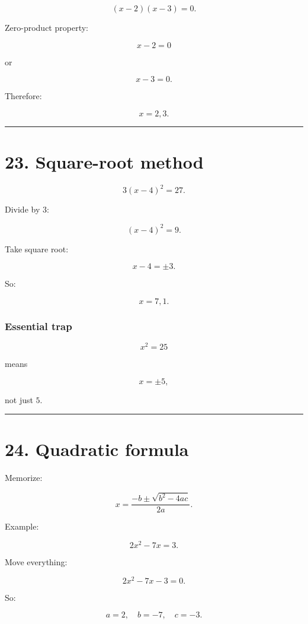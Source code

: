 \documentclass[
]{article}
\begin{document}
\[
(x-2)(x-3)=0.
\]

Zero-product property:

\[
x-2=0
\]

or

\[
x-3=0.
\]

Therefore:

\[
\boxed{x=2,3}.
\]

\begin{center}\rule{0.5\linewidth}{0.5pt}\end{center}

\section{23. Square-root method}\label{square-root-method}

\[
3(x-4)^2=27.
\]

Divide by \(3\):

\[
(x-4)^2=9.
\]

Take square root:

\[
x-4=\pm3.
\]

So:

\[
\boxed{x=7,1}.
\]

\subsubsection{Essential trap}\label{essential-trap}

\[
x^2=25
\]

means

\[
\boxed{x=\pm5},
\]

not just \(5\).

\begin{center}\rule{0.5\linewidth}{0.5pt}\end{center}

\section{24. Quadratic formula}\label{quadratic-formula}

Memorize:

\[
\boxed{x=\frac{-b\pm\sqrt{b^2-4ac}}{2a}}.
\]

Example:

\[
2x^2-7x=3.
\]

Move everything:

\[
2x^2-7x-3=0.
\]

So:

\[
a=2,\quad b=-7,\quad c=-3.
\]
\end{document}
